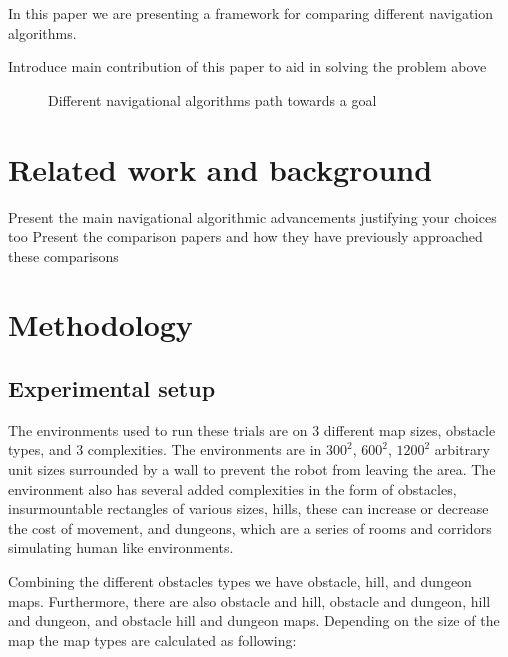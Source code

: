 \documentclass[letterpaper, 10 pt, conference]{ieeeconf}  %
\begin{document}
In this paper we are presenting a framework for comparing different navigation algorithms.

Introduce main contribution of this paper to aid in solving the problem above

\begin{figure}[thpb]
	\centering
	\caption{Different navigational algorithms path towards a goal}
	\label{figurelabel}
\end{figure}




\section{Related work and background}

Present the main navigational algorithmic advancements justifying your choices too
Present the comparison papers and how they have previously approached these comparisons


\section{Methodology}
\subsection{Experimental setup}
The environments used to run these trials are on 3 different map sizes, obstacle types, and 3 complexities. The environments are in ${300}^2$, ${600}^2$, ${1200}^2$ arbitrary unit sizes surrounded by a wall to prevent the robot from leaving the area. The environment also has several added complexities in the form of obstacles, insurmountable rectangles of various sizes, hills, these can increase or decrease the cost of movement, and dungeons, which are a series of rooms and corridors simulating human like environments.

Combining the different obstacles types we have obstacle, hill, and dungeon maps. Furthermore, there are also obstacle and hill, obstacle and dungeon, hill and dungeon, and obstacle hill and dungeon maps. Depending on the size of the map the map types are calculated as following:
\end{document}
